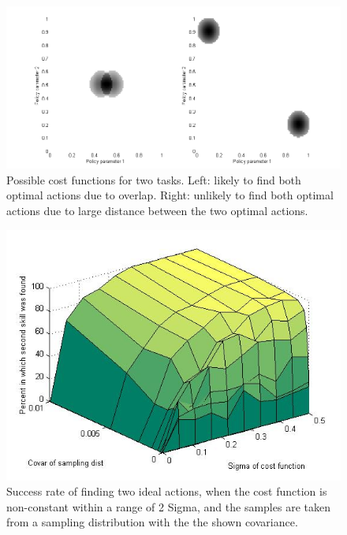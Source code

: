 \documentclass[12pt]{article}
\begin{document}
\begin{figure}[ht]
  \centering
  \includegraphics[width=0.9\columnwidth]{cost_function.png}
  \caption{ Possible cost functions for two tasks. Left: likely to find both optimal actions due to overlap. Right: unlikely to find both optimal actions due to large distance between the two optimal actions.}
  \label{fig:costfunction}
\end{figure}

\begin{figure}[ht]
  \centering
  \includegraphics[width=0.9\columnwidth]{sigma_vs_covar.png}
  \caption{\label{fig_label} Success rate of finding two ideal actions, when the cost function is non-constant within a range of 2 Sigma, and the samples are taken from a sampling distribution with the the shown covariance. }
  \label{fig:sigmavscovar}
\end{figure}
\end{document}
